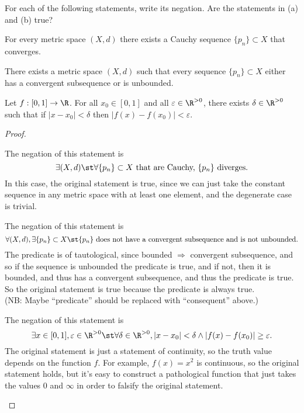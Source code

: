 \documentclass{assignment}
\begin{document}
\begin{question}
  For each of the following statements, write its negation. Are the statements in (a) and (b) true?
\begin{qparts}
  \item For every metric space $(X,d)$ there exists a Cauchy sequence $\{p_n\} \subset X$ that converges.
  \item There exists a metric space $(X, d)$ such that every sequence $\{p_n\} \subset X$ either has a 
convergent subsequence or is unbounded. 
  \item Let $f: [0,1]\to\R$. For all $x_0\in[0,1]$ and all $\varepsilon\in\R^{>0}$, there exists
$\delta\in\R^{>0}$ such that if $|x - x_0| < \delta$ then $|f(x) - f(x_0)| < \varepsilon.$
\end{qparts}
\end{question}
\begin{proof}\leavevmode
\begin{qparts}
  \item The negation of this statement is
$$\exists (X,d) \st \forall \{p_n\} \subset X \text{ that are Cauchy, } \{p_n\} \text{ diverges.}$$
In this case, the original statement is true, since we can just take the constant sequence in any
metric space with at least one element, and the degenerate case is trivial.  

  \item The negation of this statement is 
$$\forall (X, d), \exists \{p_n\} \subset X \st \{p_n\} \text{ does not have a convergent subsequence and
is not unbounded.}$$
The predicate is of tautological, since bounded $\Rightarrow$ convergent subsequence, and so if the
sequence is unbounded the predicate is true, and if not, then it is bounded, and thus has a convergent subsequence,
and thus the predicate is true. So the original statement is true because the predicate is always true.\\

(NB: Maybe ``predicate'' should be replaced with ``consequent'' above.)
  
  \item The negation of this statement is $$\exists x\in[0,1], \varepsilon\in\R^{>0} \st \forall \delta
    \in\R^{>0}, |x - x_0| < \delta \wedge |f(x) - f(x_0)| \geq \varepsilon.$$ The original statement 
    is just a statement of continuity, so the truth value depends on the function $f$. For example,
    $f(x) = x^2$ is continuous, so the original statement holds, but it's easy to construct a pathological
    function that just takes the values $0$ and $\infty$ in order to falsify the original statement.
\end{qparts} 
\end{proof}
\end{document}
